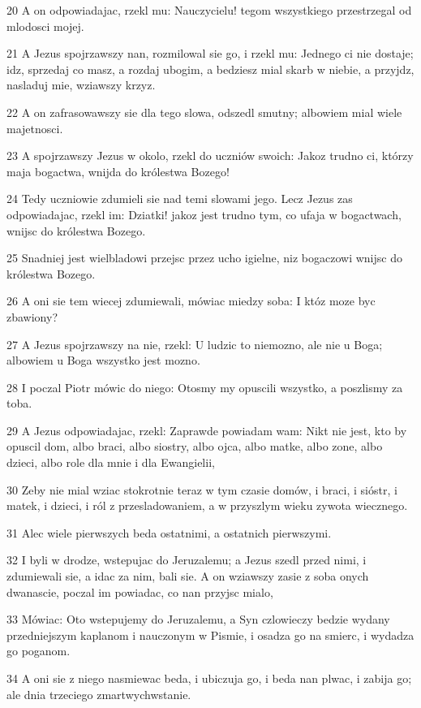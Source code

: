\par 20 A on odpowiadajac, rzekl mu: Nauczycielu! tegom wszystkiego przestrzegal od mlodosci mojej.
\par 21 A Jezus spojrzawszy nan, rozmilowal sie go, i rzekl mu: Jednego ci nie dostaje; idz, sprzedaj co masz, a rozdaj ubogim, a bedziesz mial skarb w niebie, a przyjdz, nasladuj mie, wziawszy krzyz.
\par 22 A on zafrasowawszy sie dla tego slowa, odszedl smutny; albowiem mial wiele majetnosci.
\par 23 A spojrzawszy Jezus w okolo, rzekl do uczniów swoich: Jakoz trudno ci, którzy maja bogactwa, wnijda do królestwa Bozego!
\par 24 Tedy uczniowie zdumieli sie nad temi slowami jego. Lecz Jezus zas odpowiadajac, rzekl im: Dziatki! jakoz jest trudno tym, co ufaja w bogactwach, wnijsc do królestwa Bozego.
\par 25 Snadniej jest wielbladowi przejsc przez ucho igielne, niz bogaczowi wnijsc do królestwa Bozego.
\par 26 A oni sie tem wiecej zdumiewali, mówiac miedzy soba: I któz moze byc zbawiony?
\par 27 A Jezus spojrzawszy na nie, rzekl: U ludzic to niemozno, ale nie u Boga; albowiem u Boga wszystko jest mozno.
\par 28 I poczal Piotr mówic do niego: Otosmy my opuscili wszystko, a poszlismy za toba.
\par 29 A Jezus odpowiadajac, rzekl: Zaprawde powiadam wam: Nikt nie jest, kto by opuscil dom, albo braci, albo siostry, albo ojca, albo matke, albo zone, albo dzieci, albo role dla mnie i dla Ewangielii,
\par 30 Zeby nie mial wziac stokrotnie teraz w tym czasie domów, i braci, i sióstr, i matek, i dzieci, i ról z przesladowaniem, a w przyszlym wieku zywota wiecznego.
\par 31 Alec wiele pierwszych beda ostatnimi, a ostatnich pierwszymi.
\par 32 I byli w drodze, wstepujac do Jeruzalemu; a Jezus szedl przed nimi, i zdumiewali sie, a idac za nim, bali sie. A on wziawszy zasie z soba onych dwanascie, poczal im powiadac, co nan przyjsc mialo,
\par 33 Mówiac: Oto wstepujemy do Jeruzalemu, a Syn czlowieczy bedzie wydany przedniejszym kaplanom i nauczonym w Pismie, i osadza go na smierc, i wydadza go poganom.
\par 34 A oni sie z niego nasmiewac beda, i ubiczuja go, i beda nan plwac, i zabija go; ale dnia trzeciego zmartwychwstanie.
